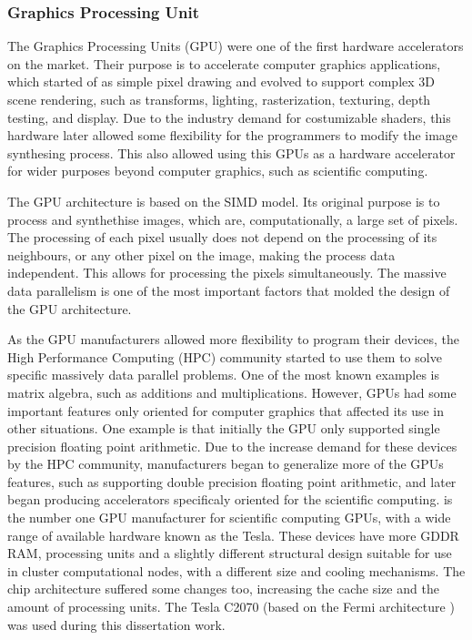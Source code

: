 \subsubsection*{Graphics Processing Unit}
\label{GPU}

The Graphics Processing Units (GPU) were one of the first hardware accelerators on the market. Their purpose is to accelerate computer graphics applications, which started of as simple pixel drawing and evolved to support complex 3D scene rendering, such as transforms, lighting, rasterization, texturing, depth testing, and display. Due to the industry demand for costumizable shaders, this hardware later allowed some flexibility for the programmers to modify the image synthesing process. This also allowed using this GPUs as a hardware accelerator for wider purposes beyond computer graphics, such as scientific computing.

The GPU architecture is based on the SIMD model. Its original purpose is to process and synthethise images, which are, computationally, a large set of pixels. The processing of each pixel usually does not depend on the processing of its neighbours, or any other pixel on the image, making the process data independent. This allows for processing the pixels simultaneously. The massive data parallelism is one of the most important factors that molded the design of the GPU architecture.

As the GPU manufacturers allowed more flexibility to program their devices, the High Performance Computing (HPC) community started to use them to solve specific massively data parallel problems. One of the most known examples is matrix algebra, such as additions and multiplications. However, GPUs had some important features only oriented for computer graphics that affected its use in other situations. One example is that initially the GPU only supported single precision floating point arithmetic. Due to the increase demand for these devices by the HPC community, manufacturers began to generalize more of the GPUs features, such as supporting double precision floating point arithmetic, and later began producing accelerators specificaly oriented for the scientific computing. \nvidia is the number one GPU manufacturer for scientific computing GPUs, with a wide range of available hardware known as the Tesla. These devices have more GDDR RAM, processing units and a slightly different structural design suitable for use in cluster computational nodes, with a different size and cooling mechanisms. The chip architecture suffered some changes too, increasing the cache size and the amount of processing units. The \nvidia Tesla C2070 (based on the Fermi architecture \cite{NVIDIA:Fermi}) was used during this dissertation work.

